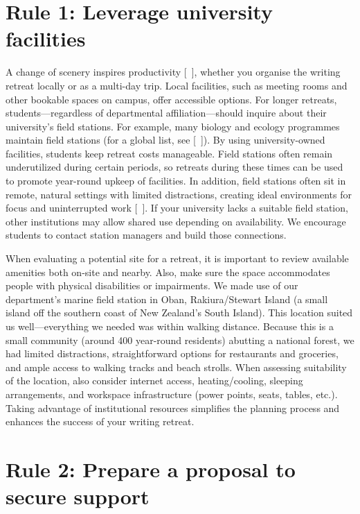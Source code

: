 \documentclass[10pt,letterpaper]{article}
\begin{document}
\section*{Rule 1: Leverage university facilities}

A change of scenery inspires productivity [~\cite{murray2013}], whether you organise the writing retreat locally or as a multi-day trip. Local facilities, such as meeting rooms and other bookable spaces on campus, offer accessible options. For longer retreats, students---regardless of departmental affiliation---should inquire about their university's field stations. For example, many biology and ecology programmes maintain field stations (for a global list, see [~\cite{tydecks2016}]). By using university-owned facilities, students keep retreat costs manageable. Field stations often remain underutilized during certain periods, so retreats during these times can be used to promote year-round upkeep of facilities. In addition, field stations often sit in remote, natural settings with limited distractions, creating ideal environments for focus and uninterrupted work [~\cite{murray2013, tremblay2021}]. If your university lacks a suitable field station, other institutions may allow shared use depending on availability. We encourage students to contact station managers and build those connections.

When evaluating a potential site for a retreat, it is important to review available amenities both on-site and nearby. Also, make sure the space accommodates people with physical disabilities or impairments. We made use of our department's marine field station in Oban, Rakiura/Stewart Island (a small island off the southern coast of New Zealand's South Island). This location suited us well---everything we needed was within walking distance. Because this is a small community (around 400 year-round residents) abutting a national forest, we had limited distractions, straightforward options for restaurants and groceries, and ample access to walking tracks and beach strolls. When assessing suitability of the location, also consider internet access, heating/cooling, sleeping arrangements, and workspace infrastructure (power points, seats, tables, etc.). Taking advantage of institutional resources simplifies the planning process and enhances the success of your writing retreat.

\section*{Rule 2: Prepare a proposal to secure support}
\end{document}
